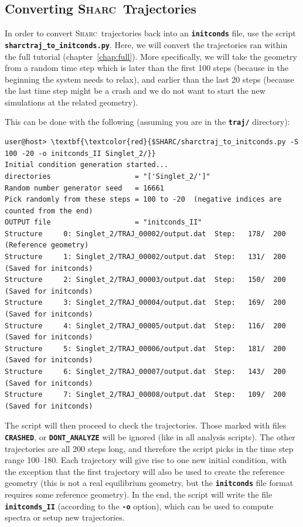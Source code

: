 \documentclass[a4paper,11pt,DIV=15,openany]{scrbook}
\newcommand{\sharc}{\textsc{Sharc}}
\newcommand{\ttt}[1]{\textbf{\texttt{#1}}}
\begin{document}
\subsection{Converting \sharc\ Trajectories}

In order to convert \sharc\ trajectories back into an \ttt{initconds} file, use the script \ttt{sharctraj\_to\_initconds.py}.
Here, we will convert the trajectories ran within the full tutorial (chapter~\ref{chap:full}).
More specifically, we will take the geometry from a random time step which is later than the first 100 steps (because in the beginning the system needs to relax), and earlier than the last 20 steps (because the last time step might be a crash and we do not want to start the new simulations at the related geometry).

This can be done with the following (assuming you are in the \ttt{traj/} directory):
\begin{oframed}
\footnotesize\begin{Verbatim}[commandchars=\\\{\}]
user@host> \textbf{\textcolor{red}{$SHARC/sharctraj_to_initconds.py -S 100 -20 -o initconds_II Singlet_2/}}
Initial condition generation started...
directories                    = "['Singlet_2/']"
Random number generator seed   = 16661
Pick randomly from these steps = 100 to -20  (negative indices are counted from the end)
OUTPUT file                    = "initconds_II"
Structure     0: Singlet_2/TRAJ_00002/output.dat  Step:   178/  200  (Reference geometry)
Structure     1: Singlet_2/TRAJ_00002/output.dat  Step:   131/  200  (Saved for initconds)
Structure     2: Singlet_2/TRAJ_00003/output.dat  Step:   150/  200  (Saved for initconds)
Structure     3: Singlet_2/TRAJ_00004/output.dat  Step:   169/  200  (Saved for initconds)
Structure     4: Singlet_2/TRAJ_00005/output.dat  Step:   116/  200  (Saved for initconds)
Structure     5: Singlet_2/TRAJ_00006/output.dat  Step:   181/  200  (Saved for initconds)
Structure     6: Singlet_2/TRAJ_00007/output.dat  Step:   143/  200  (Saved for initconds)
Structure     7: Singlet_2/TRAJ_00008/output.dat  Step:   109/  200  (Saved for initconds)
\end{Verbatim}
\end{oframed}

\normalsize
The script will then proceed to check the trajectories.
Those marked with files \ttt{CRASHED}, or \ttt{DONT\_ANALYZE} will be ignored (like in all analysis scripts).
The other trajectories are all 200 steps long, and therefore the script picks in the time step range 100--180.
Each trajectory will give rise to one new initial condition, with the exception that the first trajectory will also be used to create the reference geometry (this is not a real equilibrium geometry, but the \ttt{initconds} file format requires some reference geometry).
In the end, the script will write the file \ttt{initconds\_II} (according to the \ttt{-o} option), which can be used to compute spectra or setup new trajectories.
\end{document}
